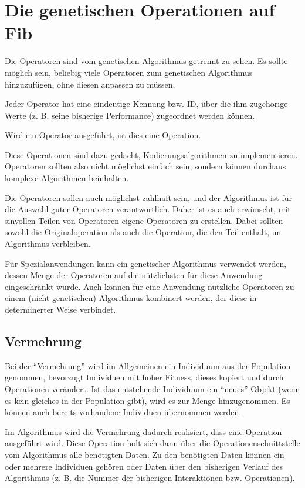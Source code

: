 \section{Die genetischen Operationen auf Fib}

Die Operatoren sind vom genetischen Algorithmus getrennt zu sehen. Es sollte möglich sein, beliebig viele Operatoren zum genetischen Algorithmus hinzuzufügen, ohne diesen anpassen zu müssen.

Jeder Operator hat eine eindeutige Kennung bzw. ID, über die ihm zugehörige Werte (z. B. seine bisherige Performance) zugeordnet werden können.

Wird ein Operator ausgeführt, ist dies eine Operation.

Diese Operationen sind dazu gedacht, Kodierungsalgorithmen zu implementieren. Operatoren sollten also nicht möglichst einfach sein, sondern können durchaus komplexe Algorithmen beinhalten.

Die Operatoren sollen auch möglichst zahlhaft sein, und der Algorithmus ist für die Auswahl guter Operatoren verantwortlich. Daher ist es auch erwünscht, mit sinvollen Teilen von Operatoren eigene Operatoren zu erstellen. Dabei sollten sowohl die Originaloperation als auch die Operation, die den Teil enthält, im Algorithmus verbleiben.

Für Spezialanwendungen kann ein genetischer Algorithmus verwendet werden, dessen Menge der Operatoren auf die nützlichsten für diese Anwendung eingeschränkt wurde.
Auch können für eine Anwendung nützliche Operatoren zu einem (nicht genetischen) Algorithmus kombinert werden, der diese in determinerter Weise verbindet.


\subsection{Vermehrung}

Bei der ``Vermehrung'' wird im Allgemeinen ein Individuum aus der Population genommen, bevorzugt Individuen mit hoher Fitness, dieses kopiert und durch Operationen verändert. Ist das entstehende Individuum ein ``neues'' Objekt (wenn es kein gleiches in der Population gibt), wird es zur Menge hinzugenommen. Es können auch bereits vorhandene Individuen übernommen werden.

Im Algorithmus wird die Vermehrung dadurch realisiert, dass eine Operation ausgeführt wird. Diese Operation holt sich dann über die Operationenschnittstelle vom Algorithmus alle benötigten Daten. Zu den benötigten Daten können ein oder mehrere Individuen gehören oder Daten über den bisherigen Verlauf des Algorithmus (z. B. die Nummer der bisherigen Interaktionen bzw. Operationen).


